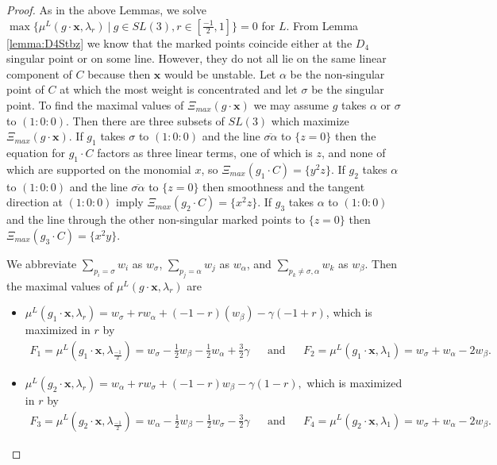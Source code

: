 \documentclass{amsart}
\numberwithin{equation}{section}
\theoremstyle{definition}
\begin{document}
 \begin{proof}
As in the above Lemmas, we solve $\max \{\mu^L(g \cdot \mathbf{x}, \lambda_r) \ | \ g \in SL(3), r \in [\frac{-1}{2},1] \} = 0$ for $L$. From Lemma \ref{lemma:D4Stbz} we know that the marked points coincide either at the $D_4$ singular point or on some line. However, they do not all lie on the same linear component of $C$ because then $\mathbf{x}$ would be unstable. Let $\alpha$ be the non-singular point of $C$ at which the most weight is concentrated and let $\sigma$ be the singular point. To find the maximal values of $\Xi_{max}(g \cdot \mathbf{x})$ we may assume $g$ takes $\alpha$ or $\sigma$ to $(1:0:0)$. Then there are three subsets of $SL(3)$ which maximize $\Xi_{max}(g \cdot \mathbf{x})$. If $g_1$ takes $\sigma$ to $(1:0:0)$ and the line $\overline{\sigma \alpha}$ to $\{z=0\}$ then the equation for $g_1 \cdot C$ factors as three linear terms, one of which is $z$, and none of which are supported on the monomial $x$, so $\Xi_{max}(g_1 \cdot C) = \{ y^2z \}$. If $g_2$ takes $\alpha$ to $(1:0:0)$ and the line $\overline{\sigma \alpha}$ to $\{z=0\}$ then smoothness and the tangent direction at $(1:0:0)$ imply $\Xi_{max}(g_2 \cdot C) = \{x^2z\}$. If $g_3$ takes $\alpha$ to $(1:0:0)$ and the line through the other non-singular marked points to $\{z=0\}$ then $\Xi_{max}(g_3 \cdot C) = \{ x^2y\}$.

We abbreviate $\sum_{p_i = \sigma} w_i$ as $w_\sigma$, $\sum_{p_j = \alpha} w_j$ as $w_\alpha$, and $\sum_{p_k \neq \sigma, \alpha} w_k$ as $w_\beta$. Then the maximal values of $\mu^L(g \cdot \mathbf{x}, \lambda_r)$ are

\begin{itemize}
    \item $\mu^L(g_1 \cdot \mathbf{x}, \lambda_r) = w_\sigma + rw_\alpha + (-1-r)(w_\beta) - \gamma(-1+r)$,
    which is maximized in $r$ by
    \begin{align*}
        F_1 = \mu^L(g_1 \cdot \mathbf{x}, \lambda_{\frac{-1}{2}}) = w_\sigma - \frac{1}{2} w_\beta - \frac{1}{2}w_\alpha + \frac{3}{2} \gamma 
        && \text{and} &&
        F_2 = \mu^L(g_1 \cdot \mathbf{x}, \lambda_1) = w_\sigma + w_\alpha - 2w_\beta.
    \end{align*}
    
    \item $\mu^L(g_2 \cdot \mathbf{x}, \lambda_r) = w_\alpha + rw_\sigma + (-1-r)w_\beta - \gamma(1-r), $
    which is maximized in $r$ by
    \begin{align*}
        F_3 = \mu^L(g_2 \cdot \mathbf{x}, \lambda_{\frac{-1}{2}}) = w_\alpha - \frac{1}{2}w_\beta - \frac{1}{2}w_\sigma - \frac{3}{2} \gamma
        && \text{and} &&
        F_4 = \mu^L(g_2 \cdot \mathbf{x}, \lambda_1) = w_\sigma + w_\alpha - 2 w_\beta.
    \end{align*}
    

\end{itemize}
\end{proof}
\end{document}
